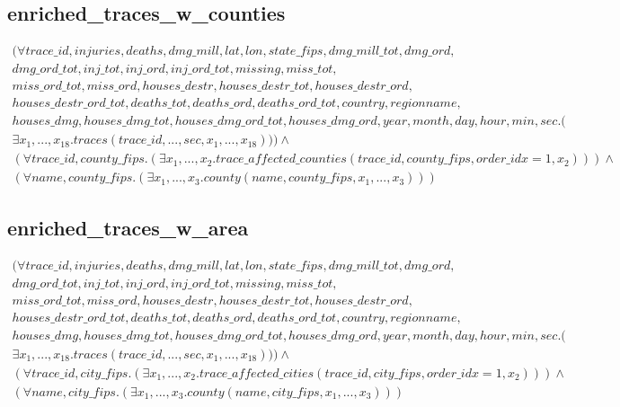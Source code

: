 \documentclass{article}
\begin{document}
\subsection{enriched\_traces\_w\_counties}
\begin{multline}
(\forall trace\_id, injuries, deaths, dmg\_mill, lat, lon, state\_fips, dmg\_mill\_tot, dmg\_ord,\\  dmg\_ord\_tot, inj\_tot, inj\_ord, inj\_ord\_tot, missing, miss\_tot, \\ miss\_ord\_tot, miss\_ord, houses\_destr, houses\_destr\_tot, houses\_destr\_ord, \\ houses\_destr\_ord\_tot, deaths\_tot, deaths\_ord, deaths\_ord\_tot, country, regionname, \\ houses\_dmg, houses\_dmg\_tot, houses\_dmg\_ord\_tot, houses\_dmg\_ord, year, month, day, hour, min, sec.( \\
\exists x_1, ..., x_{18}. traces(trace\_id, ..., sec, x_1, ..., x_{18})))  \wedge \\ 
(\forall trace\_id, county\_fips.(
\exists x_1, ..., x_{2}. trace\_affected\_counties(trace\_id, county\_fips, order\_idx=1, x_{2})))
 \wedge \\ (
 \forall name, county\_fips.(
\exists x_1, ..., x_{3}. county(name, county\_fips, x_1, ..., x_{3}))
 )
\end{multline} 

\subsection{enriched\_traces\_w\_area}
\begin{multline}
(\forall trace\_id, injuries, deaths, dmg\_mill, lat, lon, state\_fips, dmg\_mill\_tot, dmg\_ord,\\  dmg\_ord\_tot, inj\_tot, inj\_ord, inj\_ord\_tot, missing, miss\_tot, \\ miss\_ord\_tot, miss\_ord, houses\_destr, houses\_destr\_tot, houses\_destr\_ord, \\ houses\_destr\_ord\_tot, deaths\_tot, deaths\_ord, deaths\_ord\_tot, country, regionname, \\ houses\_dmg, houses\_dmg\_tot, houses\_dmg\_ord\_tot, houses\_dmg\_ord, year, month, day, hour, min, sec.( \\
\exists x_1, ..., x_{18}. traces(trace\_id, ..., sec, x_1, ..., x_{18})))  \wedge \\ 
(\forall trace\_id, city\_fips.(
\exists x_1, ..., x_{2}. trace\_affected\_cities(trace\_id, city\_fips, order\_idx=1, x_{2})))
 \wedge \\ (
 \forall name, city\_fips.(
\exists x_1, ..., x_{3}. county(name, city\_fips, x_1, ..., x_{3}))
 )
\end{multline} 
\end{document}
